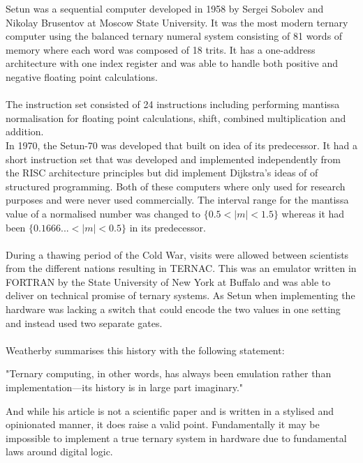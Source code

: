\documentclass[12pt]{article}
\begin{document}
Setun was a sequential computer developed in 1958 by Sergei Sobolev and Nikolay Brusentov at Moscow State University. It was the most 
modern ternary computer using the balanced ternary numeral system consisting of 81 words of memory where each word was 
composed of 18 trits.  It has a one-address architecture with one index register and was able to handle both positive and 
negative floating point calculations.\\ 
\\
The instruction set consisted of 24 instructions including performing mantissa normalisation for floating point calculations,
shift, combined multiplication and addition.
\\
In 1970, the Setun-70 was developed that built on idea of its predecessor. It had a short instruction set that was developed 
and implemented independently from the RISC architecture principles but did implement Dijkstra's ideas of of structured 
programming. Both of these computers where only used for research purposes and were never used commercially. The interval range 
for the mantissa value of a normalised number was changed to $\{0.5 < |m| < 1.5\}$ whereas it had been $\{0.1666... < |m| < 0.5\}$ 
in its predecessor.\\
\\
During a thawing period of the Cold War, visits were allowed between scientists from the different nations resulting in 
TERNAC. This was an emulator written in FORTRAN by the State University of New York at Buffalo and was able to deliver 
on technical promise of ternary systems. As Setun when implementing the hardware was lacking a switch that could encode 
the two values in one setting and instead used two separate gates.\\
\\
Weatherby summarises this history with the following statement:
\begin{displayquote}
    "Ternary computing, in other words, has always been emulation rather than implementation—its history is in large part imaginary."
\end{displayquote}
And while his article is not a scientific paper and is written in a stylised and opinionated manner, it does raise a valid point.  
Fundamentally it may be impossible to implement a true ternary system in hardware due to fundamental laws around digital logic. 
\end{document}
